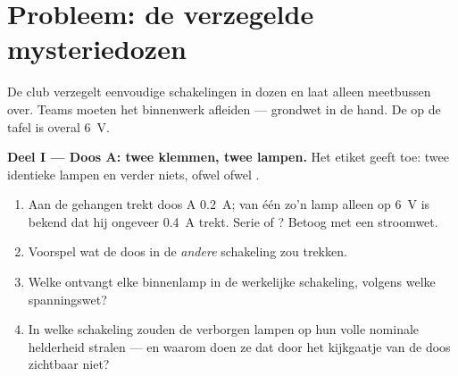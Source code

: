 \section{Probleem: de verzegelde mysteriedozen}

\begin{problem}\label{pb:g8:circuit-laws:1}
De club verzegelt eenvoudige schakelingen in dozen en laat alleen
meetbussen over. Teams moeten het binnenwerk afleiden --- grondwet in
de hand. De  op de tafel is overal \qty{6}{V}.

\medskip\noindent\textbf{Deel I --- Doos A: twee klemmen, twee
lampen.}
Het etiket geeft toe: twee identieke lampen en verder niets, ofwel
 ofwel .
\begin{enumerate}
  \item Aan de  gehangen trekt doos A \qty{0.2}{A}; van
        één zo'n lamp alleen op \qty{6}{V} is bekend dat hij ongeveer
        \qty{0.4}{A} trekt. Serie of ? Betoog met een
        stroomwet.
  \item Voorspel wat de doos in de \emph{andere} schakeling zou
        trekken.
  \item Welke  ontvangt elke binnenlamp in de werkelijke
        schakeling, volgens welke spanningswet?
  \item In welke schakeling zouden de verborgen lampen op hun volle
        nominale helderheid stralen --- en waarom doen ze dat door het
        kijkgaatje van de doos zichtbaar niet?
\end{enumerate}


\end{problem}
